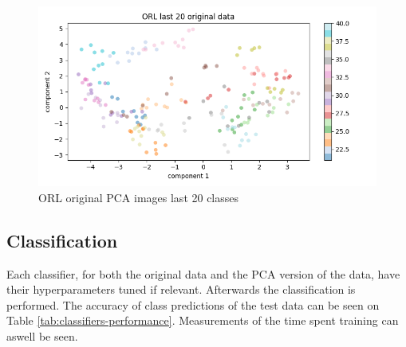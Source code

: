 \begin{figure}[htbp]
        \centering
        \includegraphics[width=1\columnwidth]{../source/orl/pictures/orl-scatter-original-second.png}
        \caption{ORL original PCA images last 20 classes}
        \label{fig:orl-scatter-second}
\end{figure}

\subsection{Classification}
Each classifier, for both the original data and the PCA version of the data, have their hyperparameters tuned if relevant. Afterwards the classification is performed.  
The accuracy of class predictions of the test data can be seen on Table \ref{tab:classifiers-performance}. Measurements of the time spent training can aswell be seen. 


